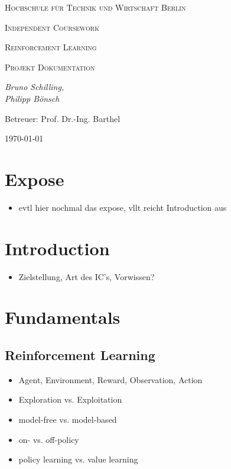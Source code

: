 \documentclass[11pt]{scrartcl}
\begin{document}
\begin{titlepage}
	\centering
	{\scshape\LARGE Hochschule für Technik und Wirtschaft Berlin \par}
	\vspace{2cm}
	{\Huge \scshape{Independent Coursework}\par}
	\vspace{2cm}
	{\LARGE \scshape{Reinforcement Learning}\par}
	{\scshape\Large Projekt Dokumentation\par}
	\vspace{4cm}
	{\large\itshape Bruno Schilling,\\Philipp Bönsch\par}
	\vfill
	
	{\large Betreuer: Prof. Dr.-Ing. Barthel \par}
	\vspace{1cm}
	{\large \today\par}
\end{titlepage}

\lstset{basicstyle=\ttfamily\small,breaklines=true}
\newpage
\tableofcontents
\newpage
\section{Expose}
\begin{itemize}
\item evtl hier nochmal das expose, vllt reicht Introduction aus
\end{itemize}
\section{Introduction}
\begin{itemize}
\item Zielstellung, Art des IC's, Vorwissen?
\end{itemize}
\section{Fundamentals}
\subsection{Reinforcement Learning}
\begin{itemize}
\item Agent, Environment, Reward, Observation, Action
\item Exploration vs. Exploitation
\item model-free vs. model-based
\item on- vs. off-policy
\item policy learning vs. value learning
\end{itemize}
\end{document}
